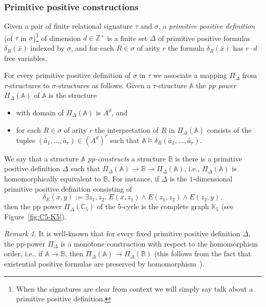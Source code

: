\documentclass{article}
\theoremstyle{definition}
\theoremstyle{remark}
\newtheorem{remark}[theorem]{Remark}
\newcommand{\bA}{{\mathbb A}}
\newcommand{\bB}{{\mathbb B}}
\newcommand{\bC}{{\mathbb C}}
\newcommand{\bK}{{\mathbb K}}
\begin{document}
\subsubsection*{Primitive positive constructions}

Given a pair of finite relational signature $\tau$ and $\sigma$, a \emph{primitive
positive definition} (of $\tau$ in $\sigma$)\footnote{When the signatures are clear from
context we will simply say talk about a primitive positive definition.} of dimension
$d\in \mathbb Z^+$ is a finite set $\Delta$ of primitive positive formulas $\delta_R(\bar{x})$
indexed by $\sigma$, and for each $R\in \sigma$ of arity $r$ the formula $\delta_R(\bar{x})$
has $r\cdot d$ free variables.

For every primitive positive definition of $\sigma$ in $\tau$ we associate
a mapping $\Pi_\Delta$ from $\tau$-structures to $\sigma$-structures as follows.
Given a $\tau$-structure $\bA$ the \emph{pp power} $\Pi_\Delta(\bA)$ of $\bA$
is the structure
\begin{itemize}
    \item  with domain of $\Pi_{\Delta}(\bA)$ is $A^d$, and
    \item for each $R\in \sigma$ of arity $r$ the interpretation of $R$ in $\Pi_\Delta(\bA)$
    consists of the tuples $(\bar{a}_1,\dots, \bar{a}_r)\in (A^d)^r$ such that
    $\bA\models \delta_R(\bar{a}_1,\dots, \bar{a}_r)$.
\end{itemize}
We say that a structure $\bA$ \emph{pp-constructs} a structure $\bB$ is there is a
primitive positive definition $\Delta$ such that $\Pi_\Delta(\bA) \to \bB \to  \Pi_\Delta(\bA)$, 
i.e., $\Pi_\Delta(\bA)$ is homomorphically equivalent to $\bB$. For instance,
if $\Delta$ is the $1$-dimensional primitive positive definition consisting of 
\[
\delta_E(x,y):=\exists z_1,z_2.\; E(x,z_1)\land E(z_1,z_2)\land E(z_2,y),
\]
then the pp power $\Pi_\Delta(\bC_5)$ of the $5$-cycle is the complete graph
$\bK_5$ (see Figure~\ref{fig:C5-K5}).

\begin{remark}\label{rmk:pp-power-monotone}
    It is well-known that for every fixed primitive positive definition $\Delta$, 
    the pp-power $\Pi_\Delta$ is a monotone construction with respect to the homomorphism order, 
    i.e.,  if $\bA\to \bB$, then $\Pi_\Delta(\bA)\to \Pi_\Delta(\bB)$ (this follows
    from the fact that existential positive formulas are preserved by homomorphism~\cite[Theorem 2.5.2]{Book}).
\end{remark}
\end{document}

